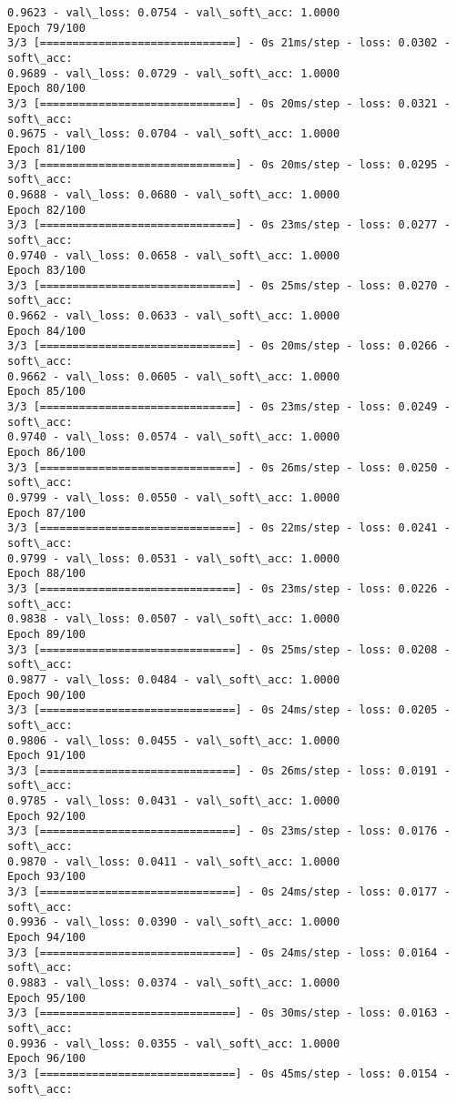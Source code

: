 \documentclass[11pt]{article}
\begin{document}
\begin{Verbatim}[commandchars=\\\{\}]
0.9623 - val\_loss: 0.0754 - val\_soft\_acc: 1.0000
Epoch 79/100
3/3 [==============================] - 0s 21ms/step - loss: 0.0302 - soft\_acc:
0.9689 - val\_loss: 0.0729 - val\_soft\_acc: 1.0000
Epoch 80/100
3/3 [==============================] - 0s 20ms/step - loss: 0.0321 - soft\_acc:
0.9675 - val\_loss: 0.0704 - val\_soft\_acc: 1.0000
Epoch 81/100
3/3 [==============================] - 0s 20ms/step - loss: 0.0295 - soft\_acc:
0.9688 - val\_loss: 0.0680 - val\_soft\_acc: 1.0000
Epoch 82/100
3/3 [==============================] - 0s 23ms/step - loss: 0.0277 - soft\_acc:
0.9740 - val\_loss: 0.0658 - val\_soft\_acc: 1.0000
Epoch 83/100
3/3 [==============================] - 0s 25ms/step - loss: 0.0270 - soft\_acc:
0.9662 - val\_loss: 0.0633 - val\_soft\_acc: 1.0000
Epoch 84/100
3/3 [==============================] - 0s 20ms/step - loss: 0.0266 - soft\_acc:
0.9662 - val\_loss: 0.0605 - val\_soft\_acc: 1.0000
Epoch 85/100
3/3 [==============================] - 0s 23ms/step - loss: 0.0249 - soft\_acc:
0.9740 - val\_loss: 0.0574 - val\_soft\_acc: 1.0000
Epoch 86/100
3/3 [==============================] - 0s 26ms/step - loss: 0.0250 - soft\_acc:
0.9799 - val\_loss: 0.0550 - val\_soft\_acc: 1.0000
Epoch 87/100
3/3 [==============================] - 0s 22ms/step - loss: 0.0241 - soft\_acc:
0.9799 - val\_loss: 0.0531 - val\_soft\_acc: 1.0000
Epoch 88/100
3/3 [==============================] - 0s 23ms/step - loss: 0.0226 - soft\_acc:
0.9838 - val\_loss: 0.0507 - val\_soft\_acc: 1.0000
Epoch 89/100
3/3 [==============================] - 0s 25ms/step - loss: 0.0208 - soft\_acc:
0.9877 - val\_loss: 0.0484 - val\_soft\_acc: 1.0000
Epoch 90/100
3/3 [==============================] - 0s 24ms/step - loss: 0.0205 - soft\_acc:
0.9806 - val\_loss: 0.0455 - val\_soft\_acc: 1.0000
Epoch 91/100
3/3 [==============================] - 0s 26ms/step - loss: 0.0191 - soft\_acc:
0.9785 - val\_loss: 0.0431 - val\_soft\_acc: 1.0000
Epoch 92/100
3/3 [==============================] - 0s 23ms/step - loss: 0.0176 - soft\_acc:
0.9870 - val\_loss: 0.0411 - val\_soft\_acc: 1.0000
Epoch 93/100
3/3 [==============================] - 0s 24ms/step - loss: 0.0177 - soft\_acc:
0.9936 - val\_loss: 0.0390 - val\_soft\_acc: 1.0000
Epoch 94/100
3/3 [==============================] - 0s 24ms/step - loss: 0.0164 - soft\_acc:
0.9883 - val\_loss: 0.0374 - val\_soft\_acc: 1.0000
Epoch 95/100
3/3 [==============================] - 0s 30ms/step - loss: 0.0163 - soft\_acc:
0.9936 - val\_loss: 0.0355 - val\_soft\_acc: 1.0000
Epoch 96/100
3/3 [==============================] - 0s 45ms/step - loss: 0.0154 - soft\_acc:

\end{Verbatim}
\end{document}
